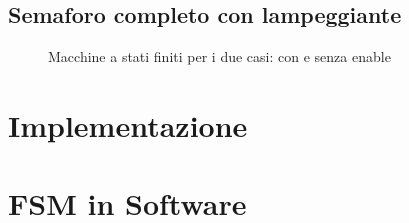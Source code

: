 \documentclass[a4paper,10pt]{article}
\begin{document}
\subsection{Semaforo completo con lampeggiante}

\begin{figure}[H]
	\centering
	
	\caption{Macchine a stati finiti per i due casi: con e senza enable}
\end{figure}

\section{Implementazione}

\section{FSM in Software}
\end{document}
